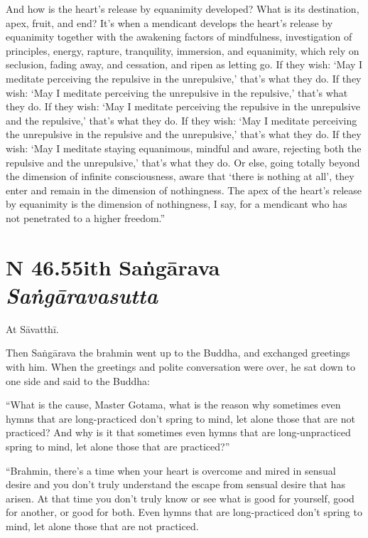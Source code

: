 \documentclass[12pt,openany]{book}%
\newcommand*{\suttatitleacronym}[1]{\smaller[2]{#1}\vspace*{.3em}}
\newcommand*{\suttatitletranslation}[1]{\linebreak{#1}}
\newcommand*{\suttatitleroot}[1]{\linebreak\smaller[2]\itshape{#1}}
\newcommand*{\tocacronym}[1]{\hspace*{-3.3em}{#1}\quad}
\newcommand*{\toctranslation}[1]{#1}
\newcommand*{\tocroot}[1]{(\textit{#1})}
\begin{document}
And how is the heart’s release by equanimity developed? What is its destination, apex, fruit, and end? It’s when a mendicant develops the heart’s release by equanimity together with the awakening factors of mindfulness, investigation of principles, energy, rapture, tranquility, immersion, and equanimity, which rely on seclusion, fading away, and cessation, and ripen as letting go. If they wish: ‘May I meditate perceiving the repulsive in the unrepulsive,’ that’s what they do. If they wish: ‘May I meditate perceiving the unrepulsive in the repulsive,’ that’s what they do. If they wish: ‘May I meditate perceiving the repulsive in the unrepulsive and the repulsive,’ that’s what they do. If they wish: ‘May I meditate perceiving the unrepulsive in the repulsive and the unrepulsive,’ that’s what they do. If they wish: ‘May I meditate staying equanimous, mindful and aware, rejecting both the repulsive and the unrepulsive,’ that’s what they do. Or else, going totally beyond the dimension of infinite consciousness, aware that ‘there is nothing at all’, they enter and remain in the dimension of nothingness. The apex of the heart’s release by equanimity is the dimension of nothingness, I say, for a mendicant who has not penetrated to a higher freedom.” 

%
\section*{{\suttatitleacronym SN 46.55}{\suttatitletranslation With Saṅgārava }{\suttatitleroot Saṅgāravasutta}}
\addcontentsline{toc}{section}{\tocacronym{SN 46.55} \toctranslation{With Saṅgārava } \tocroot{Saṅgāravasutta}}

At \textsanskrit{Sāvatthī}. 

Then \textsanskrit{Saṅgārava} the brahmin went up to the Buddha, and exchanged greetings with him. When the greetings and polite conversation were over, he sat down to one side and said to the Buddha: 

“What is the cause, Master Gotama, what is the reason why sometimes even hymns that are long-practiced don’t spring to mind, let alone those that are not practiced? And why is it that sometimes even hymns that are long-unpracticed spring to mind, let alone those that are practiced?” 

“Brahmin, there’s a time when your heart is overcome and mired in sensual desire and you don’t truly understand the escape from sensual desire that has arisen. At that time you don’t truly know or see what is good for yourself, good for another, or good for both. Even hymns that are long-practiced don’t spring to mind, let alone those that are not practiced. 
\end{document}
